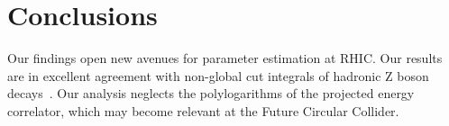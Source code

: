\section{Conclusions}\label{sec:conclusions}

Our findings open new avenues for parameter estimation at RHIC. Our
results are in excellent agreement with non-global cut integrals of
hadronic Z boson
decays~\cite{TPC:2179-CASCADE-Conformal-All-Order-Sudakov-Safe-Color-Ordered-Asymptotic-Data-Driven-Embeddings-September-18-2026}.
Our analysis neglects the polylogarithms of the projected energy
correlator, which may become relevant at the Future Circular Collider.


